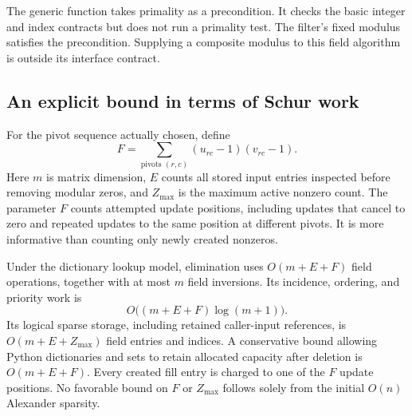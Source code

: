 The generic function takes primality as a precondition.  It checks the
basic integer and index contracts but does not run a primality test.  The
filter's fixed modulus satisfies the precondition.  Supplying a composite
modulus to this field algorithm is outside its interface contract.

\subsection{An explicit bound in terms of Schur work}

For the pivot sequence actually chosen, define
\begin{equation}
 F=\sum_{\text{pivots }(r,c)}(u_{rc}-1)(v_{rc}-1).
 \label{eq:sparse-fill-work}
\end{equation}
Here $m$ is matrix dimension, $E$ counts all stored input entries inspected
before removing modular zeros, and $Z_{\max}$ is the maximum active nonzero
count.  The parameter $F$ counts attempted update positions, including updates that cancel to
zero and repeated updates to the same position at different pivots.  It is
more informative than counting only newly created nonzeros.

\begin{theorem}
\label{thm:sparse-work}
Under the dictionary lookup model, elimination uses $O(m+E+F)$ field
operations, together with at most $m$ field inversions.  Its incidence,
ordering, and priority work is
\[
 O\bigl((m+E+F)\log(m+1)\bigr).
\]
Its logical sparse storage, including retained caller-input references, is
$O(m+E+Z_{\max})$ field entries and indices.  A conservative bound allowing
Python dictionaries and sets to retain allocated capacity after deletion is
$O(m+E+F)$.  Every created fill entry is
charged to one of the $F$ update positions.  No favorable bound on $F$ or
$Z_{\max}$ follows solely from the initial $O(n)$ Alexander sparsity.
\end{theorem}

